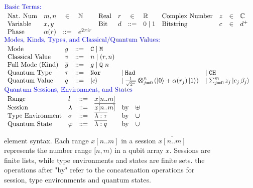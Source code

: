 \begin{figure}[t]
{
  \small
\[\hspace*{-0.5em}
\begin{array}{l}
\textcolor{blue}{\text{Basic Terms:}}\\[0.2em]
\begin{array}{llcl llcl llcl}
\text{Nat. Num} & m, n & \in & \mathbb{N}
&
      \text{Real} & r & \in & \mathbb{R}
&
      \text{Complex Number} & z & \in & \mathbb{C}
\\
      \text{Variable} & x,y &&

 & \text{Bit} & d & ::= & 0\mid 1       
&
      \text{Bitstring} & c & \in & d^{+}      
\\
\text{Phase} & \alpha(r) & ::= & e^{2\pi i r}
\\
\end{array}
\\[1em]
\textcolor{blue}{\text{Modes, Kinds, Types, and Classical/Quantum Values:}}\\[0.2em]
\begin{array}{llclll} 
      \text{Mode} & g & ::= & \cmode  \mid \mmode\\
      \text{Classical Value} & v & ::= & n \mid (r,n)\\
      \text{Full Mode (Kind)} & \overline{g} & ::= & g \mid \qmode{n} \\
      \text{Quantum Type} & \tau & ::= & \tnort &\mid \thadt & \mid \tcht \\
      \text{Quantum Value} & q & ::= & \ket{c} & \mid \shad{2^n}{n}{\alpha(r_j)} &\mid \sch{m}{z_j}{c_j \,\beta_j} \\
    \end{array}
\\[1em]
\textcolor{blue}{\text{Quantum Sessions, Environment, and States}}\\[0.2em]
\begin{array}{llclcl} 
      \text{Range} & l & ::= & x[n..m] \\
      \text{Session} & \lambda & ::= & \overline{x[n..m]} & \text{by} & \uplus \\
      \text{Type Environment} & \sigma & ::= & \overline{\lambda : \tau } & \text{by} & \cup \\
      \text{Quantum State} & \varphi & ::= & \overline{ \lambda : q } & \text{by} & \cup \\
    \end{array}
\end{array}
  \]
}
  \caption{\qafny element syntax. Each range $x[n..m]$ in a session $\overline{x[n..m]}$ represents the number range $[n,m)$ in a qubit array $x$. Sessions are finite lists, while type environments and states are finite sets. the operations after "by" refer to the concatenation operations for session, type environments and quantum states. }
  \label{fig:qafny-state}
\end{figure}

